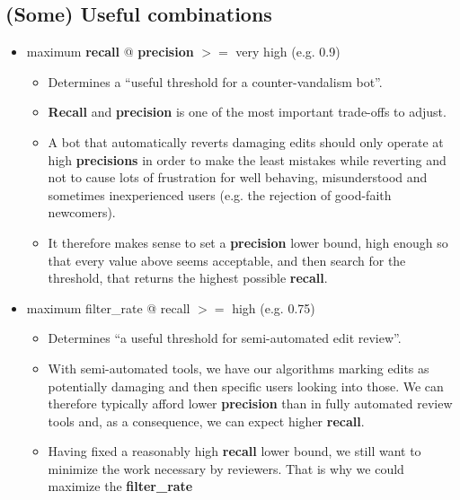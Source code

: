 \documentclass[12pt,a4paper]{article}
\begin{document}
\subsection{(Some) Useful combinations}
\begin{itemize}
\item maximum \textbf{recall} @ \textbf{precision} $>=$ very high (e.g. 0.9)
\begin{itemize}
\item Determines a ``useful threshold for a counter-vandalism bot''.
\item \textbf{Recall} and \textbf{precision} is one of the most important trade-offs to adjust.
\item A bot that automatically reverts damaging edits should only operate at high \textbf{precisions} in order to make the least mistakes while reverting and not to cause lots of frustration for well behaving, misunderstood and sometimes inexperienced users (e.g. the rejection of good-faith newcomers).
\item It therefore makes sense to set a \textbf{precision} lower bound, high enough so that every value above seems acceptable, and then search for the threshold, that returns the highest possible \textbf{recall}.
\end{itemize} 
\item maximum filter\_rate @ recall $>=$ high (e.g. 0.75)
\begin{itemize}
\item Determines ``a useful threshold for semi-automated edit review''.
\item With semi-automated tools, we have our algorithms marking edits as potentially damaging and then specific users looking into those. We can therefore typically afford lower \textbf{precision} than in fully automated review tools and, as a consequence, we can expect higher \textbf{recall}.
\item Having fixed a reasonably high \textbf{recall} lower bound, we still want to minimize the work necessary by reviewers. That is why we could maximize the \textbf{filter\_rate}
\end{itemize}
\end{itemize}
%
%
%
\end{document}
